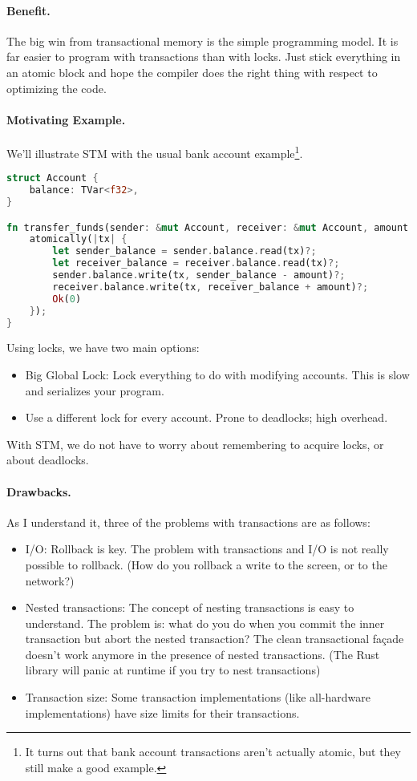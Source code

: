 \paragraph{Benefit.} The big win from transactional memory is the simple
programming model. It is far easier to program with transactions than with
locks. Just stick everything in an atomic block and hope the compiler does the
right thing with respect to optimizing the code.

\paragraph{Motivating Example.} We'll illustrate STM with the usual bank account example\footnote{It turns out that bank account transactions aren't actually atomic, but they still make a good example.}.
\begin{lstlisting}[language=Rust]
struct Account {
    balance: TVar<f32>,
}

fn transfer_funds(sender: &mut Account, receiver: &mut Account, amount: f32) {
    atomically(|tx| {
        let sender_balance = sender.balance.read(tx)?;
        let receiver_balance = receiver.balance.read(tx)?;
        sender.balance.write(tx, sender_balance - amount)?;
        receiver.balance.write(tx, receiver_balance + amount)?;
        Ok(0)
    });
}
\end{lstlisting}

Using locks, we have two main options:
      \begin{itemize}
        \item Big Global Lock: Lock everything to do with modifying accounts. This is slow and serializes your program.
        \item Use a different lock for every account. Prone to deadlocks; high overhead.
      \end{itemize}
With STM, we do not have to worry about remembering to acquire locks,
or about deadlocks.

\paragraph{Drawbacks.} As I understand it, three of the problems with 
transactions are as follows:

\begin{itemize}
\item I/O: Rollback is key. The problem with transactions and I/O is
  not really possible to rollback. (How do you rollback a write to the
  screen, or to the network?)

\item Nested transactions: The concept of nesting transactions is easy
  to understand. The problem is: what do you do when you commit the
  inner transaction but abort the nested transaction? The clean
  transactional fa\c{c}ade doesn't work anymore in the presence of
  nested transactions. (The Rust library will panic at runtime if you try to nest transactions)

\item Transaction size: Some transaction implementations (like
  all-hardware implementations) have size limits for their
  transactions.
\end{itemize}

